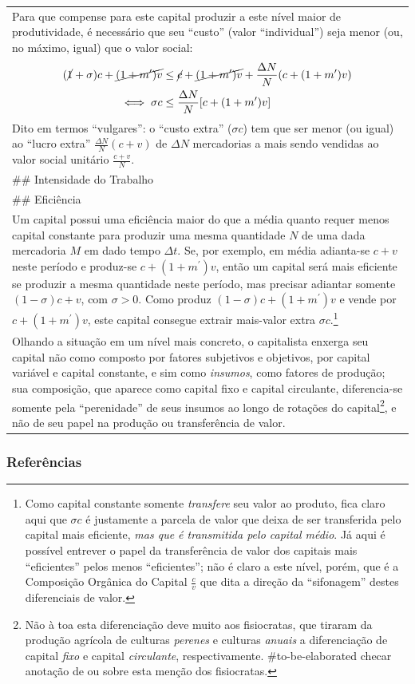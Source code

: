 \documentclass[12pt]{article}
\numberwithin{equation}{section}
\theoremstyle{plain}
\theoremstyle{definition}
\theoremstyle{remark}
\begin{document}
\begin{longtable}[]{@{}
  >{\raggedright\arraybackslash}p{}@{}}
Para que compense para este capital produzir a este nível maior de produtividade, é necessário que seu ``custo'' (valor ``individual'') seja menor (ou, no máximo, igual) que o valor social: \begin{align*}
(\cancel{ 1 }+\sigma)c + \cancel{ (1 +m^{\prime})v } &\leq \cancel{ c }+\cancel{ (1+m^{\prime})v } + \frac{\Delta N}{N}(c+(1+m^{\prime})v) \\
\iff \sigma c & \leq \frac{\Delta N}{N}[c+(1+m^{\prime})v]
\end{align*} Dito em termos ``vulgares'': o ``custo extra'' ($\sigma c$) tem que ser menor (ou igual) ao ``lucro extra'' $\frac{\Delta N}{N}(c+v)$ de $\Delta N$ mercadorias a mais sendo vendidas ao valor social unitário $\frac{c+v}{N}$. \\
\#\# Intensidade do Trabalho \\
\#\# Eficiência \\
Um capital possui uma eficiência maior do que a média quanto requer menos capital constante para produzir uma mesma quantidade $N$ de uma dada mercadoria $M$ em dado tempo $\Delta t$. Se, por exemplo, em média adianta-se $c+v$ neste período e produz-se $c+(1+m^{\prime})v$, então um capital será mais eficiente se produzir a mesma quantidade neste período, mas precisar adiantar somente $(1-\sigma)c + v$, com $\sigma>0$. Como produz $(1-\sigma)c + (1+m^{\prime})v$ e vende por $c+(1+m^{\prime})v$, este capital consegue extrair mais-valor extra $\sigma c$.\footnote{Como capital constante somente \emph{transfere} seu valor ao produto, fica claro aqui que $\sigma c$ é justamente a parcela de valor que deixa de ser transferida pelo capital mais eficiente, \emph{mas que é transmitida pelo capital médio}. Já aqui é possível entrever o papel da transferência de valor dos capitais mais ``eficientes'' pelos menos ``eficientes''; não é claro a este nível, porém, que é a Composição Orgânica do Capital $\frac{c}{v}$ que dita a direção da ``sifonagem'' destes diferenciais de valor.} \\
Olhando a situação em um nível mais concreto, o capitalista enxerga seu capital não como composto por fatores subjetivos e objetivos, por capital variável e capital constante, e sim como \emph{insumos}, como fatores de produção; sua composição, que aparece como capital fixo e capital circulante, diferencia-se somente pela ``perenidade'' de seus insumos ao longo de rotações do capital\footnote{Não à toa esta diferenciação deve muito aos fisiocratas, que tiraram da produção agrícola de culturas \emph{perenes} e culturas \emph{anuais} a diferenciação de capital \emph{fixo} e capital \emph{circulante}, respectivamente. \#to-be-elaborated checar anotação de \textcite{Marx2014} ou \textcite{Marx2017a} sobre esta menção dos fisiocratas.}, e não de seu papel na produção ou transferência de valor. \\
\end{longtable}

\hypertarget{referuxeancias}{%
\subsubsection{Referências}\label{referuxeancias}}

\printbibliography
\end{document}
